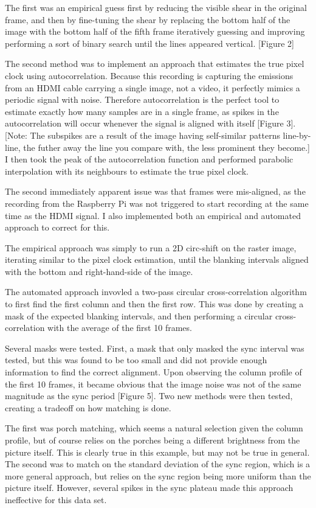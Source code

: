 \documentclass[11pt]{article}
\begin{document}
{{    The first was an empirical guess first by reducing the visible shear in the original frame, and then by fine-tuning the shear by replacing the bottom half of the image with the bottom half of the fifth frame iteratively guessing and improving performing a sort of binary search until the lines appeared vertical. [Figure 2]

    The second method was to implement an approach that estimates the true pixel clock using autocorrelation. Because this recording is capturing the emissions from an HDMI cable carrying a single image, not a video, it perfectly mimics a periodic signal with noise. Therefore autocorrelation is the perfect tool to estimate exactly how many samples are in a single frame, as spikes in the autocorrelation will occur whenever the signal is aligned with itself [Figure 3]. [Note: The subspikes are a result of the image having self-similar patterns line-by-line, the futher away the line you compare with, the less prominent they become.] I then took the peak of the autocorrelation function and performed parabolic interpolation with its neighbours to estimate the true pixel clock.

    The second immediately apparent issue was that frames were mis-aligned, as the recording from the Raspberry Pi was not triggered to start recording at the same time as the HDMI signal. I also implemented both an empirical and automated approach to correct for this.

    The empirical approach was simply to run a 2D circ-shift on the raster image, iterating similar to the pixel clock estimation, until the blanking intervals aligned with the bottom and right-hand-side of the image.

    The automated approach invovled a two-pass circular cross-correlation algorithm to first find the first column and then the first row. This was done by creating a mask of the expected blanking intervals, and then performing a circular cross-correlation with the average of the first 10 frames. 

    Several masks were tested. First, a mask that only masked the sync interval was tested, but this was found to be too small and did not provide enough information to find the correct alignment. Upon observing the column profile of the first 10 frames, it became obvious that the image noise was not of the same magnitude as the sync period [Figure 5]. Two new methods were then tested, creating a tradeoff on how matching is done.

    The first was porch matching, which seems a natural selection given the column profile, but of course relies on the porches being a different brightness from the picture itself. This is clearly true in this example, but may not be true in general. The second was to match on the standard deviation of the sync region, which is a more general approach, but relies on the sync region being more uniform than the picture itself. However, several spikes in the sync plateau made this approach ineffective for this data set.

}}
\end{document}
